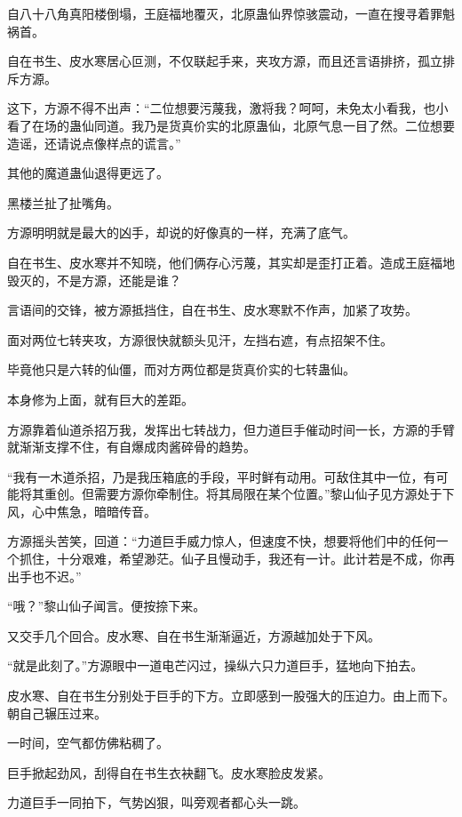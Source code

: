 
\begin{this_body}

自八十八角真阳楼倒塌，王庭福地覆灭，北原蛊仙界惊骇震动，一直在搜寻着罪魁祸首。

自在书生、皮水寒居心叵测，不仅联起手来，夹攻方源，而且还言语排挤，孤立排斥方源。

这下，方源不得不出声：“二位想要污蔑我，激将我？呵呵，未免太小看我，也小看了在场的蛊仙同道。我乃是货真价实的北原蛊仙，北原气息一目了然。二位想要造谣，还请说点像样点的谎言。”

其他的魔道蛊仙退得更远了。

黑楼兰扯了扯嘴角。

方源明明就是最大的凶手，却说的好像真的一样，充满了底气。

自在书生、皮水寒并不知晓，他们俩存心污蔑，其实却是歪打正着。造成王庭福地毁灭的，不是方源，还能是谁？

言语间的交锋，被方源抵挡住，自在书生、皮水寒默不作声，加紧了攻势。

面对两位七转夹攻，方源很快就额头见汗，左挡右遮，有点招架不住。

毕竟他只是六转的仙僵，而对方两位都是货真价实的七转蛊仙。

本身修为上面，就有巨大的差距。

方源靠着仙道杀招万我，发挥出七转战力，但力道巨手催动时间一长，方源的手臂就渐渐支撑不住，有自爆成肉酱碎骨的趋势。

“我有一木道杀招，乃是我压箱底的手段，平时鲜有动用。可敌住其中一位，有可能将其重创。但需要方源你牵制住。将其局限在某个位置。”黎山仙子见方源处于下风，心中焦急，暗暗传音。

方源摇头苦笑，回道：“力道巨手威力惊人，但速度不快，想要将他们中的任何一个抓住，十分艰难，希望渺茫。仙子且慢动手，我还有一计。此计若是不成，你再出手也不迟。”

“哦？”黎山仙子闻言。便按捺下来。

又交手几个回合。皮水寒、自在书生渐渐逼近，方源越加处于下风。

“就是此刻了。”方源眼中一道电芒闪过，操纵六只力道巨手，猛地向下拍去。

皮水寒、自在书生分别处于巨手的下方。立即感到一股强大的压迫力。由上而下。朝自己辗压过来。

一时间，空气都仿佛粘稠了。

巨手掀起劲风，刮得自在书生衣袂翻飞。皮水寒脸皮发紧。

力道巨手一同拍下，气势凶狠，叫旁观者都心头一跳。


\end{this_body}
